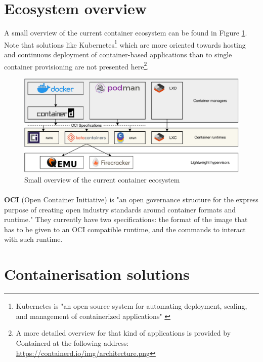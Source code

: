 \section{Ecosystem overview}
A small overview of the current container ecosystem can be found in Figure \ref{fig:overview}.  Note that solutions like Kubernetes\footnote{Kubernetes is "an open-source system for automating deployment, scaling, and management of containerized applications" \cite{kubernetes}} which are more oriented towards hosting and continuous deployment of container-based applications than to single container provisioning are not presented here\footnote{A more detailed overview for that kind of applications is provided by Containerd at the following address: \href{https://containerd.io/img/architecture.png}{https://containerd.io/img/architecture.png}}.
\begin{figure}[h!]
  \begin{center}
    \includegraphics[width=\linewidth]{images/ecosystem.pdf}
    \caption{Small overview of the current container ecosystem}
    \label{fig:overview}
  \end{center}
\end{figure}
\paragraph{}\textbf{OCI} (Open Container Initiative) is "an open governance structure for the express purpose of creating open industry standards around container formats and runtime."\cite{oci} They currently have two specifications: the format of the image that has to be given to an OCI compatible runtime, and the commands to interact with such runtime.

\section{Containerisation solutions}
